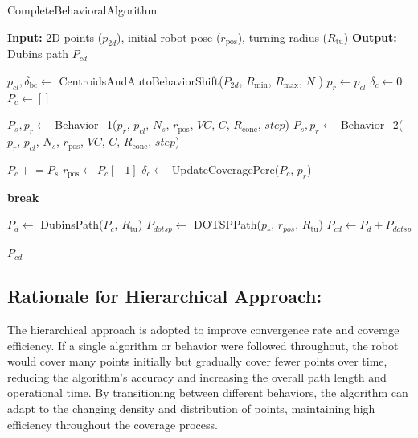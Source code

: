 \begin{algorithm}[H]
    \caption{CompleteBehavioralAlgorithm}
    \label{alg:completebehavioralalgorithm}
    \begin{algorithmic}[1]
    \Statex \textbf{Input:} 2D points ($p_{2d}$), initial robot pose ($r_{\text{pos}}$), turning radius ($R_{\text{tu}}$) 
    \Statex \textbf{Output:} Dubins path $P_{cd}$
    \newline

    \State $p_{cl}, \delta_{\text{bc}} \leftarrow$ CentroidsAndAutoBehaviorShift($P_{2d}$, $R_{\text{min}}$, $R_{\text{max}}$, $N$ )
    \State $p_r \leftarrow p_{cl}$
    \State $\delta_c \leftarrow 0$
    \State $P_c \leftarrow []$
    
            \State $P_s, p_r \leftarrow$ Behavior\_1($p_r$, $p_{cl}$, $N_s$, $r_{\text{pos}}$, $VC$, $C$, $R_{\text{conc}}$, $step$)
        \Else
            \State $P_s, p_r \leftarrow$ Behavior\_2($p_r$, $p_{cl}$, $N_s$, $r_{\text{pos}}$, $VC$, $C$, $R_{\text{conc}}$, $step$)
        \EndIf
        
        \State $P_c \mathrel{+}= P_s$
        \State $r_{\text{pos}} \leftarrow P_c[-1]$
        \State $\delta_c \leftarrow$ UpdateCoveragePerc($P_c$, $p_r$)
        
            \State \textbf{break}
        \EndIf
    \EndWhile
    
    \State $P_d \leftarrow$ DubinsPath($P_c$, $R_{\text{tu}}$)
    \State $P_{dotsp} \leftarrow$ DOTSPPath($p_r$, $r_{pos}$, $R_{\text{tu}}$)
    \State $P_{cd} \leftarrow P_d + P_{dotsp}$

    \State \Return $P_{cd}$
    \end{algorithmic}
\end{algorithm}
    

\subsection{Rationale for Hierarchical Approach: } 


The hierarchical approach is adopted to improve convergence rate and coverage efficiency. If a single algorithm or behavior were followed throughout, the robot would cover many points initially but gradually cover fewer points over time, reducing the algorithm's accuracy and increasing the overall path length and operational time. By transitioning between different behaviors, the algorithm can adapt to the changing density and distribution of points, maintaining high efficiency throughout the coverage process.

